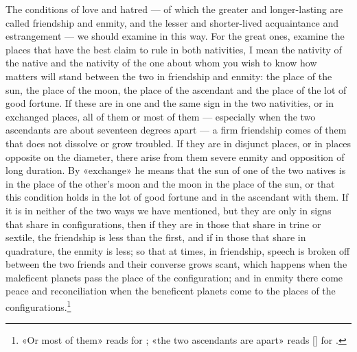 \documentclass[11pt]{article}
\newcommand{\Fol}[1]{\marginpar{\footnotesize\color{gray}f.\,#1}}
\begin{document}
\par \Fol{71v}The conditions of love and hatred — of which the greater and longer-lasting are called friendship and enmity, and the lesser and shorter-lived acquaintance and estrangement — we should examine in this way. For the great ones, examine the places that have the best claim to rule in both nativities, I mean the nativity of the native and the nativity of the one about whom you wish to know how matters will stand between the two in friendship and enmity: the place of the sun, the place of the moon, the place of the ascendant and the place of the lot of good fortune. If these are in one and the same sign in the two nativities, or in exchanged places, all of them or most of them — especially when the two ascendants are about seventeen degrees apart — a firm friendship comes of them that does not dissolve or grow troubled. If they are in disjunct places, or in places opposite on the diameter, there arise from them severe enmity and opposition of long duration. By «exchange» he means that the sun of one of the two natives is in the place of the other's moon and the moon in the place of the sun, or that this condition holds in the lot of good fortune and in the ascendant with them. If it is in neither of the two ways we have mentioned, but they are only in signs that share in configurations, then if they are in those that share in trine or sextile, the friendship is less than the first, and if in those that share in quadrature, the enmity is less; so that at times, in friendship, speech is broken off between the two friends and their converse grows scant, which happens when the maleficent planets pass the place of the configuration; and in enmity there come peace and reconciliation when the beneficent planets come to the places of the configurations.\footnote{«Or most of them» reads  for ; «the two ascendants are apart» reads []  for .}\par
\end{document}
